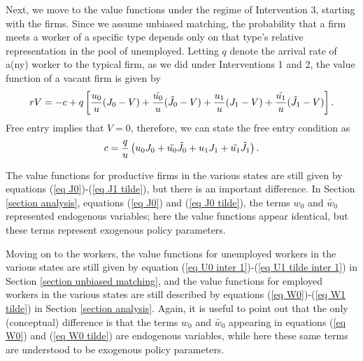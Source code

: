 \documentclass[12pt]{article} %
\theoremstyle{definition}
\begin{document}
\noindent Next, we move to the value functions under the regime of Intervention 3, starting with the firms. Since we assume unbiased matching, the probability that a firm meets a worker of a specific type depends only on that type's relative representation in the pool of unemployed. Letting $q$ denote the arrival rate of a(ny) worker to the typical firm, as we did under Interventions 1 and 2, the value function of a vacant firm is given by 
\begin{equation}
   rV = -c + q \left[\frac{u_0}{u}(J_0-V) + \frac{\Tilde{u_0}}{u}(\Tilde{J_0}-V) + \frac{u_1}{u}(J_1-V) +  \frac{\Tilde{u_1}}{u}(\Tilde{J_1}-V) \right].\nonumber 
\end{equation}Free entry implies that $V=0$, therefore, we can state the free entry condition as 
\begin{equation}
 c = \frac{q}{u} \left({u_0} J_0 + \Tilde{u_0} \Tilde{J_0} + {u_1} J_1 +  \Tilde{u_1} \Tilde{J_1} \right).\label{eq free entry inter 3} 
\end{equation}

The value functions for productive firms in the various states are still given by equations (\ref{eq J0})-(\ref{eq J1 tilde}), 
but there is an important difference. In Section \ref{section analysis}, equations (\ref{eq J0}) and (\ref{eq J0 tilde}), the terms $w_0$ and $\tilde{w_0}$ represented endogenous variables; here the value functions appear identical, but these terms represent exogenous policy parameters.   

Moving on to the workers, the value functions for unemployed workers in the various states are still given by equation (\ref{eq U0 inter 1})-(\ref{eq U1 tilde inter 1}) in Section \ref{section unbiased matching}, and the value functions for employed workers in the various states are still described by equations (\ref{eq W0})-(\ref{eq W1 tilde}) in Section \ref{section analysis}. Again, it is useful to point out that the only (conceptual) difference is that the terms $w_0$ and $\tilde{w_0}$ appearing in equations (\ref{eq W0}) and (\ref{eq W0 tilde}) are endogenous variables, while here these same terms are understood to be exogenous policy parameters.  
\end{document}
